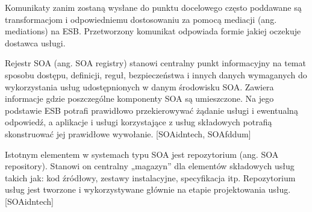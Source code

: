 Komunikaty zanim zostaną wysłane do punktu docelowego często poddawane są transformacjom i odpowiedniemu dostosowaniu za pomocą mediacji (ang. mediations) na ESB. Przetworzony komunikat odpowiada formie jakiej oczekuje dostawca usługi.
	
Rejestr SOA (ang. SOA registry) stanowi centralny punkt informacyjny na temat sposobu dostępu, definicji, reguł, bezpieczeństwa i innych danych wymaganych do wykorzystania usług udostępnionych w danym środowisku SOA. Zawiera informacje gdzie poszczególne komponenty SOA są umieszczone. Na jego podstawie ESB potrafi prawidłowo przekierowywać żądanie usługi i ewentualną odpowiedź, a aplikacje i usługi korzystające z usług składowych potrafią skonstruować jej prawidłowe wywołanie. [SOAidntech, SOAfddum]
	
Istotnym elementem w systemach typu SOA jest repozytorium (ang. SOA repository). Stanowi on centralny „magazyn” dla elementów składowych usług takich jak: kod źródłowy, zestawy instalacyjne, specyfikacja itp. Repozytorium usług jest tworzone i wykorzystywane głównie na etapie projektowania usług. [SOAidntech]

